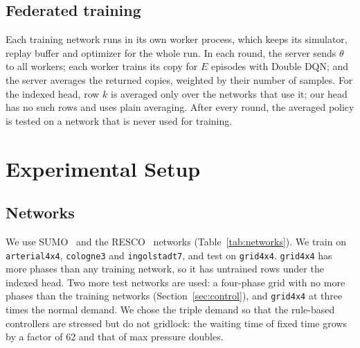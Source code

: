\documentclass[conference]{IEEEtran}
\begin{document}
\subsection{Federated training}
Each training network runs in its own worker process, which keeps its simulator, replay
buffer and optimizer for the whole run. In each round, the server sends $\theta$ to all
workers; each worker trains its copy for $E$ episodes with Double DQN; and the server
averages the returned copies, weighted by their number of samples. For the indexed head,
row $k$ is averaged only over the networks that use it; our head has no such rows and uses
plain averaging. After every round, the averaged policy is tested on a network that is
never used for training.

\section{Experimental Setup}\label{sec:setup}

\subsection{Networks}\label{sec:scenarios}
We use SUMO~\cite{sumo} and the RESCO~\cite{resco} networks (Table~\ref{tab:networks}).
We train on \texttt{arterial4x4}, \texttt{cologne3} and \texttt{ingolstadt7}, and test on
\texttt{grid4x4}. \texttt{grid4x4} has more phases than any training network, so it has
untrained rows under the indexed head. Two more test networks are used: a four-phase grid
with no more phases than the training networks (Section~\ref{sec:control}), and
\texttt{grid4x4} at three times the normal demand. We chose the triple demand so that the
rule-based controllers are stressed but do not gridlock: the waiting time of fixed time
grows by a factor of 62 and that of max pressure doubles.
\end{document}
